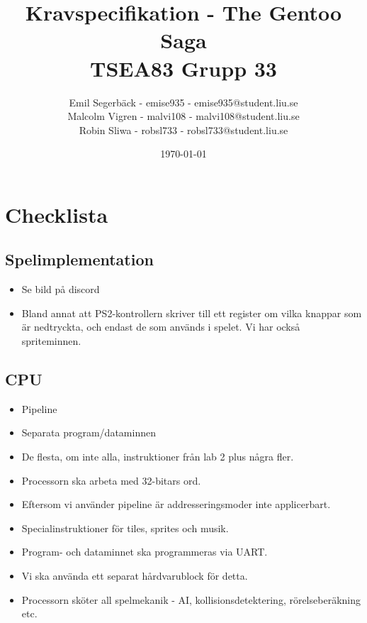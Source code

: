 \documentclass[a4paper,titlepage]{article}
\title{
\textbf{Kravspecifikation - The Gentoo Saga} \\
\large TSEA83 Grupp 33}
\date{\today}
\author{
        Emil Segerbäck - emise935 - emise935@student.liu.se\\
		Malcolm Vigren - malvi108 - malvi108@student.liu.se \\
		Robin Sliwa - robsl733 - robsl733@student.liu.se }
\begin{document}
    \maketitle
    \newpage
\tableofcontents
    \newpage

%
%
%
 
\newpage
\section{Checklista}
    \subsection{Spelimplementation}
        \begin{itemize}
            \item Se bild på discord
            \item Bland annat att PS2-kontrollern skriver till ett register om
                vilka knappar som är nedtryckta, och endast de som används i
                spelet. Vi har också spriteminnen.
        \end{itemize}
    \subsection{CPU}
        \begin{itemize}
            \item Pipeline
            \item Separata program/dataminnen
            \item De flesta, om inte alla, instruktioner från lab 2 plus några
				fler.
            \item Processorn ska arbeta med 32-bitars ord.
            \item Eftersom vi använder pipeline är addresseringsmoder inte applicerbart.
            \item Specialinstruktioner för tiles, sprites och musik.
            \item Program- och dataminnet ska programmeras via UART.
            \item Vi ska använda ett separat hårdvarublock för detta.
            \item Processorn sköter all spelmekanik - AI,
				kollisionsdetektering, rörelseberäkning etc.
        \end{itemize}
\end{document}
